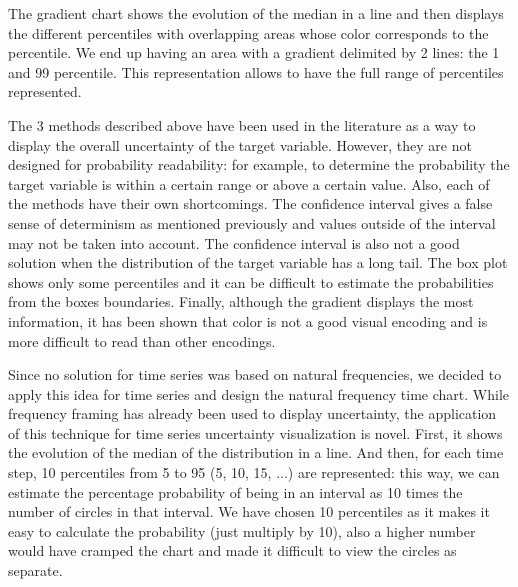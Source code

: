 \documentclass[a4paper,3p,sort&compress]{elsarticle}
\begin{document}
The gradient chart shows the evolution of the median in a line and then displays the different percentiles
with overlapping areas whose color corresponds to the percentile. We end up having an area with a gradient 
delimited by 2 lines: the 1 and 99 percentile. This representation allows to have the
 full range of percentiles represented.

The 3 methods described above have been used in the literature as a way to display the overall uncertainty 
of the target variable. However, they are not designed for probability readability: for example, to determine 
the probability the target variable is within a certain range or above a certain value. Also,
each of the methods have their own shortcomings. The confidence interval gives a false sense of determinism as mentioned previously
and values outside of the interval may not be taken into account. The confidence interval is also not a good solution 
when the distribution of the target variable has a long tail. The box plot shows only some percentiles and it can be difficult to 
estimate the probabilities from the boxes boundaries. Finally, although the gradient displays the most information, it has been 
shown \cite{cleveland_graphical_1984} that color is not 
a good visual encoding and is more difficult to read than other encodings.

Since no solution for time series was based on natural frequencies, we decided to apply this idea for time series 
and design the natural frequency time chart.
While frequency framing has already been used to display uncertainty, the application of this technique for time series 
uncertainty visualization is novel. First, 
it shows the evolution of the median of the distribution in a line. And then, for each time 
step, 10 percentiles from 5 to 95 (5, 10, 15, ...) are represented: this way, we can estimate the percentage 
probability of being in an interval as 10 times the number of circles in that interval. 
We have chosen 10 percentiles as it makes it easy to calculate the probability (just multiply by 10), also a higher number
would have cramped the chart and made it difficult to view the circles as separate. 
\end{document}
